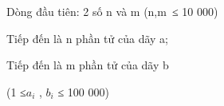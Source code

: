 Dòng đầu tiên: 2 số n và m (n,m ≤ 10 000)

Tiếp đến là n phần tử của dãy a;

Tiếp đến là m phần tử của dãy b

(1 ≤$a_{i}$ , $b_{i}$ ≤ 100 000)